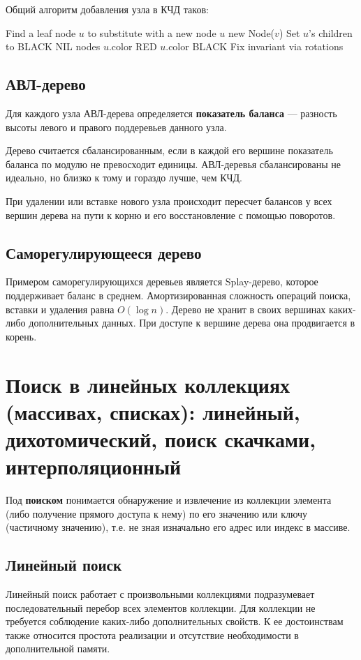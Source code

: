 Общий алгоритм добавления узла в КЧД таков:
\begin{algorithmic}
    \State Find a leaf node $u$ to substitute with a new node
    \State $u$ \asgn new Node($v$)
    \State Set $u$'s children to BLACK NIL nodes
    \State $u$.color \asgn RED
      \State $u$.color \asgn BLACK
      \State Fix invariant via rotations
    \EndIf
  \EndProcedure
\end{algorithmic}
\subsection{АВЛ-дерево}
Для каждого узла АВЛ-дерева определяется \textbf{показатель баланса} --- разность
высоты левого и правого поддеревьев данного узла.

Дерево считается сбалансированным, если в каждой его вершине показатель баланса
по модулю не превосходит единицы. АВЛ-деревья сбалансированы не идеально, но близко
к тому и гораздо лучше, чем КЧД.

При удалении или вставке нового узла происходит пересчет балансов у всех вершин дерева на пути к корню
и его восстановление с помощью поворотов.

\subsection{Саморегулирующееся дерево}
Примером саморегулирующихся деревьев является Splay-дерево, которое поддерживает баланс в среднем.
Амортизированная сложность операций поиска, вставки и удаления равна $O(\log n)$. Дерево не хранит
в своих вершинах каких-либо дополнительных данных. При доступе к вершине дерева она продвигается в корень.


\section{Поиск в линейных коллекциях (массивах, списках): линейный, дихотомический, поиск скачками, интерполяционный}
Под \textbf{поиском} понимается обнаружение и извлечение из коллекции элемента
(либо получение прямого доступа к нему) по его значению или
ключу (частичному значению), т.е. не зная изначально его адрес
или индекс в массиве.

\subsection{Линейный поиск}
Линейный поиск работает с произвольными коллекциями подразумевает последовательный перебор всех
элементов коллекции. Для коллекции не требуется соблюдение каких-либо дополнительных свойств.
К ее достоинствам также относится простота реализации и отсутствие необходимости в дополнительной
памяти.

